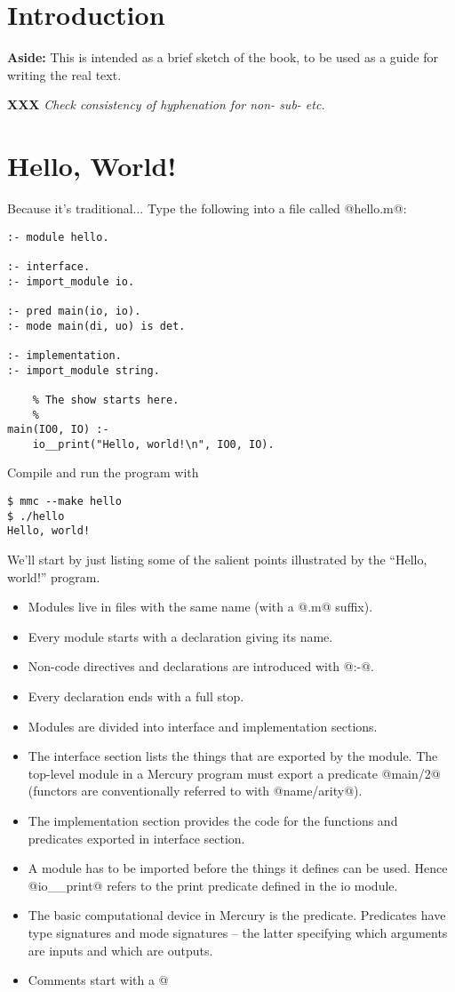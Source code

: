 \documentclass[a4paper,11pt,notitlepage,onecolumn]{article}
\newcommand{\XXX}[1]%
{{\small\textbf{XXX} \emph{#1}}}
\newcommand{\Aside}[1]%
{{\small{\begin{description}\item{\textbf{Aside:}} #1\end{description}}}}
\begin{document}
\section{Introduction}

\Aside{This is intended as a brief sketch of the book, to be used as a guide
for writing the real text.}

\XXX{Check consistency of hyphenation for non- sub- etc.}



\section{Hello, World!}

Because it's traditional...  Type the following into a file called
@hello.m@:
\begin{verbatim}
:- module hello.

:- interface.
:- import_module io.

:- pred main(io, io).
:- mode main(di, uo) is det.

:- implementation.
:- import_module string.

    % The show starts here.
    %
main(IO0, IO) :-
    io__print("Hello, world!\n", IO0, IO).
\end{verbatim}
Compile and run the program with
\begin{verbatim}
$ mmc --make hello
$ ./hello
Hello, world!
\end{verbatim}
We'll start by just listing some of the salient points illustrated
by the ``Hello, world!'' program.
\begin{itemize}
\item Modules live in files with the same name (with a @.m@ suffix).
\item Every module starts with a declaration giving its name.
\item Non-code directives and declarations are introduced with @:-@.
\item Every declaration ends with a full stop.
\item Modules are divided into interface and implementation sections.
\item The interface section lists the things that are exported by the
  module.  The top-level module in a Mercury program must export a
  predicate @main/2@ (functors are conventionally referred to with
  @name/arity@).
\item The implementation section provides the code for the functions
  and predicates exported in interface section.
\item A module has to be imported before the things it defines can be
  used.  Hence @io__print@ refers to the print predicate defined in
  the io module.
\item The basic computational device in Mercury is the predicate.
  Predicates have type signatures and mode signatures -- the latter
  specifying which arguments are inputs and which are outputs.
\item Comments start with a @%
\end{itemize}
\end{document}
